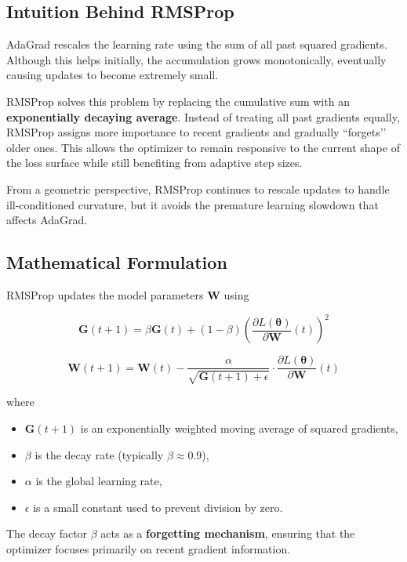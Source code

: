 \documentclass{article}
\begin{document}
\subsection{Intuition Behind RMSProp}

AdaGrad rescales the learning rate using the sum of all past squared gradients. Although this helps initially, the accumulation grows monotonically, eventually causing updates to become extremely small.

RMSProp solves this problem by replacing the cumulative sum with an \textbf{exponentially decaying average}. Instead of treating all past gradients equally, RMSProp assigns more importance to recent gradients and gradually “forgets’’ older ones. This allows the optimizer to remain responsive to the current shape of the loss surface while still benefiting from adaptive step sizes.

From a geometric perspective, RMSProp continues to rescale updates to handle ill-conditioned curvature, but it avoids the premature learning slowdown that affects AdaGrad.

\subsection{Mathematical Formulation}

RMSProp updates the model parameters \( \mathbf{W} \) using

\[
\mathbf{G}(t+1) = \beta \mathbf{G}(t) + (1 - \beta)
\left( \frac{\partial L(\boldsymbol{\theta})}{\partial \mathbf{W}} (t) \right)^2
\]

\[
\mathbf{W}(t+1) = \mathbf{W}(t) -
\frac{\alpha}{\sqrt{\mathbf{G}(t+1) + \epsilon}}
\cdot
\frac{\partial L(\boldsymbol{\theta})}{\partial \mathbf{W}}(t)
\]

\noindent where
\begin{itemize}
    \item \( \mathbf{G}(t+1) \) is an exponentially weighted moving average of squared gradients,
    \item \( \beta \) is the decay rate (typically \( \beta \approx 0.9 \)),
    \item \( \alpha \) is the global learning rate,
    \item \( \epsilon \) is a small constant used to prevent division by zero.
\end{itemize}

The decay factor \( \beta \) acts as a \textbf{forgetting mechanism}, ensuring that the optimizer focuses primarily on recent gradient information.
\end{document}
